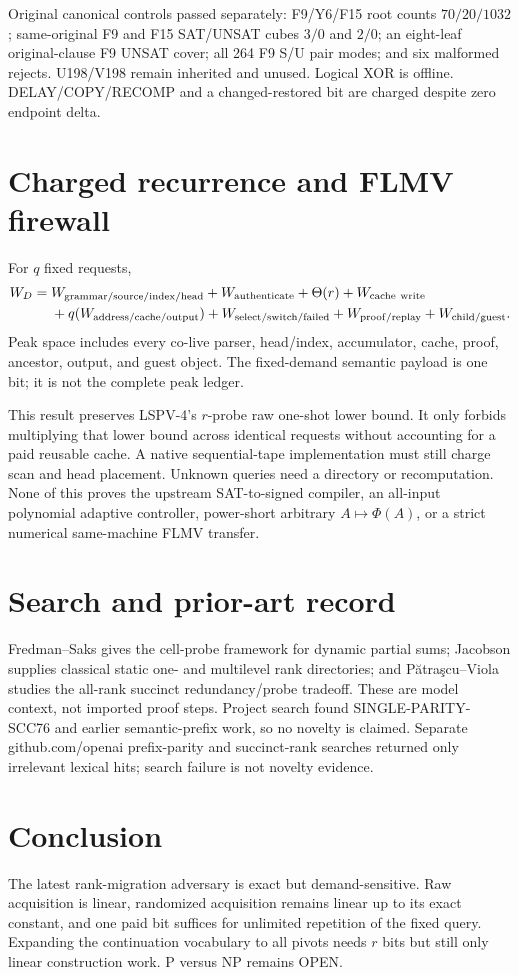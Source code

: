 \documentclass[11pt]{article}
\begin{document}
Original canonical controls passed separately: F9/Y6/F15 root counts
$70/20/1032$; same-original F9 and F15 SAT/UNSAT cubes $3/0$ and $2/0$;
an eight-leaf original-clause F9 UNSAT cover; all 264 F9 S/U pair modes; and
six malformed rejects. U198/V198 remain inherited and unused. Logical XOR is
offline. DELAY/COPY/RECOMP and a changed-restored bit are charged despite zero
endpoint delta.

\section{Charged recurrence and FLMV firewall}
For $q$ fixed requests,
\[
\begin{split}
W_D={}&W_{\rm grammar/source/index/head}+W_{\rm authenticate}
+\Theta(r)+W_{\rm cache\ write}\\
&+q(W_{\rm address/cache/output})+W_{\rm select/switch/failed}
+W_{\rm proof/replay}+W_{\rm child/guest}.
\end{split}
\]
Peak space includes every co-live parser, head/index, accumulator, cache,
proof, ancestor, output, and guest object. The fixed-demand semantic payload
is one bit; it is not the complete peak ledger.

This result preserves LSPV-4's $r$-probe raw one-shot lower bound. It only
forbids multiplying that lower bound across identical requests without
accounting for a paid reusable cache. A native sequential-tape implementation
must still charge scan and head placement. Unknown queries need a directory or
recomputation. None of this proves the upstream SAT-to-signed compiler, an
all-input polynomial adaptive controller, power-short arbitrary
$A\mapsto\Phi(A)$, or a strict numerical same-machine FLMV transfer.

\section{Search and prior-art record}
Fredman--Saks gives the cell-probe framework for dynamic partial sums;
Jacobson supplies classical static one- and multilevel rank directories; and
P\u{a}tra\c{s}cu--Viola studies the all-rank succinct redundancy/probe
tradeoff. These are model context, not imported proof steps. Project search
found SINGLE-PARITY-SCC76 and earlier semantic-prefix work, so no novelty is
claimed. Separate github.com/openai prefix-parity and succinct-rank searches
returned only irrelevant lexical hits; search failure is not novelty evidence.

\section{Conclusion}
The latest rank-migration adversary is exact but demand-sensitive. Raw
acquisition is linear, randomized acquisition remains linear up to its exact
constant, and one paid bit suffices for unlimited repetition of the fixed
query. Expanding the continuation vocabulary to all pivots needs $r$ bits but
still only linear construction work. P versus NP remains OPEN.
\end{document}
